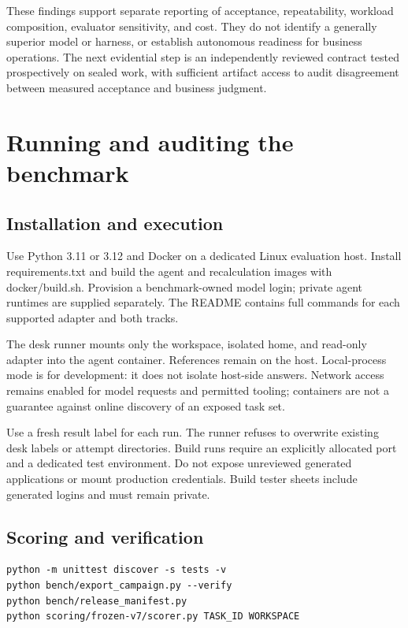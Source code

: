 These findings support separate reporting of acceptance, repeatability, workload composition, evaluator sensitivity, and cost. They do not identify a generally superior model or harness, or establish autonomous readiness for business operations. The next evidential step is an independently reviewed contract tested prospectively on sealed work, with sufficient artifact access to audit disagreement between measured acceptance and business judgment.

\clearpage


\clearpage
\appendix

\section{Running and auditing the benchmark}\label{app:A}

\subsection{Installation and execution}\label{installation-and-execution}

Use Python 3.11 or 3.12 and Docker on a dedicated Linux evaluation host. Install requirements.txt and build the agent and recalculation images with docker/build.sh. Provision a benchmark-owned model login; private agent runtimes are supplied separately. The README contains full commands for each supported adapter and both tracks.

The desk runner mounts only the workspace, isolated home, and read-only adapter into the agent container. References remain on the host. Local-process mode is for development: it does not isolate host-side answers. Network access remains enabled for model requests and permitted tooling; containers are not a guarantee against online discovery of an exposed task set.

Use a fresh result label for each run. The runner refuses to overwrite existing desk labels or attempt directories. Build runs require an explicitly allocated port and a dedicated test environment. Do not expose unreviewed generated applications or mount production credentials. Build tester sheets include generated logins and must remain private.

\subsection{Scoring and verification}\label{scoring-and-verification}

\begin{verbatim}
python -m unittest discover -s tests -v
python bench/export_campaign.py --verify
python bench/release_manifest.py
python scoring/frozen-v7/scorer.py TASK_ID WORKSPACE
\end{verbatim}

